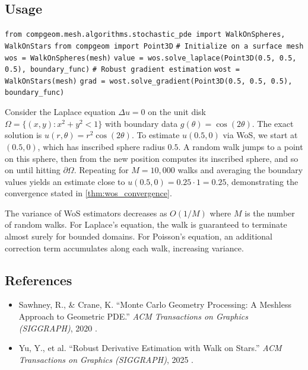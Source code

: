

\subsection{Usage}
\begin{algorithm}
\caption{Stochastic PDE Solver Usage\label{alg:stochastic_pde_usage}}
\begin{algorithmic}[1]
\State \texttt{from compgeom.mesh.algorithms.stochastic\_pde import WalkOnSpheres, WalkOnStars}
\State \texttt{from compgeom import Point3D}
\Statex
\State \texttt{\# Initialize on a surface mesh}
\State \texttt{wos = WalkOnSpheres(mesh)}
\State \texttt{value = wos.solve\_laplace(Point3D(0.5, 0.5, 0.5), boundary\_func)}
\Statex
\State \texttt{\# Robust gradient estimation}
\State \texttt{wost = WalkOnStars(mesh)}
\State \texttt{grad = wost.solve\_gradient(Point3D(0.5, 0.5, 0.5), boundary\_func)}
\end{algorithmic}
\end{algorithm}

\begin{example}\label{example:wos_unit_disk}
Consider the Laplace equation $\Delta u = 0$ on the unit disk $\Omega = \{(x,y) : x^2 + y^2 < 1\}$ with boundary data $g(\theta) = \cos(2\theta)$. The exact solution is $u(r, \theta) = r^2 \cos(2\theta)$. To estimate $u(0.5, 0)$ via WoS, we start at $(0.5, 0)$, which has inscribed sphere radius $0.5$. A random walk jumps to a point on this sphere, then from the new position computes its inscribed sphere, and so on until hitting $\partial\Omega$. Repeating for $M = 10{,}000$ walks and averaging the boundary values yields an estimate close to $u(0.5, 0) = 0.25 \cdot 1 = 0.25$, demonstrating the convergence stated in \cref{thm:wos_convergence}.
\end{example}

\begin{remark}
The variance of WoS estimators decreases as $O(1/M)$ where $M$ is the number of random walks. For Laplace's equation, the walk is guaranteed to terminate almost surely for bounded domains. For Poisson's equation, an additional correction term accumulates along each walk, increasing variance.
\end{remark}

\subsection{References}
\begin{itemize}
  \item Sawhney, R., \& Crane, K. ``Monte Carlo Geometry Processing: A Meshless Approach to Geometric PDE.'' \textit{ACM Transactions on Graphics (SIGGRAPH)}, 2020 \cite{sawhney2020}.
  \item Yu, Y., et al. ``Robust Derivative Estimation with Walk on Stars.'' \textit{ACM Transactions on Graphics (SIGGRAPH)}, 2025 \cite{yu2025}.
\end{itemize}

